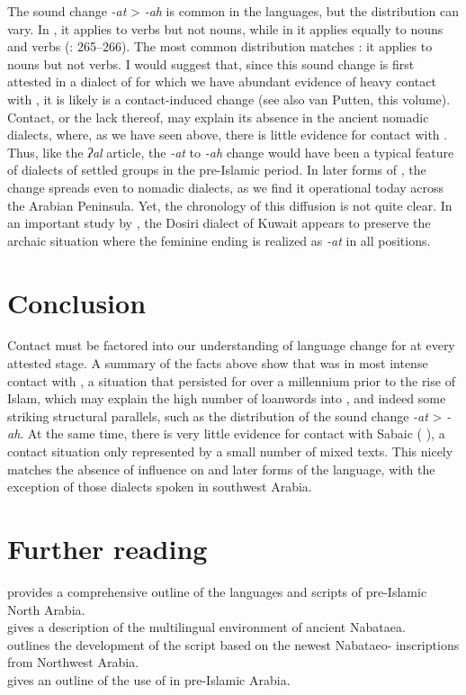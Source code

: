 \documentclass[output=paper]{langsci/langscibook}
\begin{document}
The sound change \textit{-at} > \textit{-ah} is common in the   languages, but the distribution can vary. In , it applies to verbs but not nouns, while in  it applies equally to nouns and verbs (\citealt{HuehnergardRubin2011}: 265--266). The most common  distribution matches : it applies to nouns but not verbs. I would suggest that, since this sound change is first attested in a dialect of  for which we have abundant evidence of heavy contact with , it is likely is a contact-induced change (see also van Putten, this volume). Contact, or the lack thereof, may explain its absence in the ancient nomadic dialects, where, as we have seen above, there is little evidence for contact with . Thus, like the \textit{ʔal} {article}, the \textit{-at} to \textit{-ah} change would have been a typical feature of  dialects of settled groups in the pre-Islamic period. In later forms of , the change spreads even to nomadic dialects, as we find it operational today across the Arabian Peninsula. Yet, the chronology of this {diffusion} is not quite clear. In an important study by \citet{vanPutten2017}, the Dosiri dialect of Kuwait appears to preserve the archaic situation where the feminine ending is realized as \textit{-at} in all positions.

\section{Conclusion}
Contact must be factored into our understanding of {language change} for  at every attested stage. A summary of the facts above show that  was in most intense contact with , a situation that persisted for over a millennium prior to the rise of Islam, which may explain the high number of  {loanwords} into , and indeed some striking structural parallels, such as the distribution of the sound change \textit{-at} > \textit{-ah}. At the same time, there is very little evidence for contact with Sabaic ( ), a contact situation only represented by a small number of mixed texts.  This nicely matches the absence of  influence on   and later forms of the language, with the exception of those dialects spoken in southwest Arabia.

\section*{Further reading}
\citet{Al-Jallad2018ANA} provides a comprehensive outline of the languages and scripts of pre-Islamic North Arabia.\\
\citet{Macdonald2003} gives a description of the multilingual environment of ancient Nabataea. \\
\citet{Nehmé2010} outlines the development of the  script based on the newest Nabataeo- inscriptions from Northwest Arabia.\\
\citet{Stein2018} gives an outline of the use of  in pre-Islamic Arabia.
\end{document}
